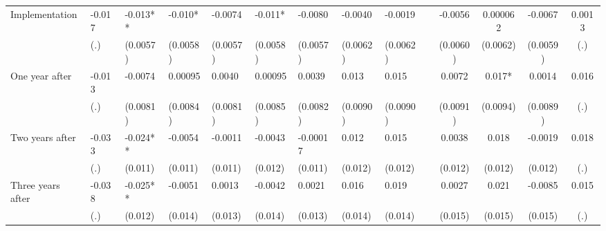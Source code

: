 \begin{tabular}{lccccrrrrrcccc}
Implementation & \multicolumn{1}{l}{-0.017} & \multicolumn{1}{l}{-0.013**} & \multicolumn{1}{l}{-0.010*} & \multicolumn{1}{l}{-0.0074} & \multicolumn{1}{l}{-0.011*} & \multicolumn{1}{l}{-0.0080} & \multicolumn{1}{l}{-0.0040} & \multicolumn{1}{l}{-0.0019} &       & -0.0056 & 0.000062 & -0.0067 & 0.0013 \\
      & \multicolumn{1}{l}{(.)} & \multicolumn{1}{l}{(0.0057)} & \multicolumn{1}{l}{(0.0058)} & \multicolumn{1}{l}{(0.0057)} & \multicolumn{1}{l}{(0.0058)} & \multicolumn{1}{l}{(0.0057)} & \multicolumn{1}{l}{(0.0062)} & \multicolumn{1}{l}{(0.0062)} &       & (0.0060) & (0.0062) & (0.0059) & (.) \\
One year after & \multicolumn{1}{l}{-0.013} & \multicolumn{1}{l}{-0.0074} & \multicolumn{1}{l}{0.00095} & \multicolumn{1}{l}{0.0040} & \multicolumn{1}{l}{0.00095} & \multicolumn{1}{l}{0.0039} & \multicolumn{1}{l}{0.013} & \multicolumn{1}{l}{0.015} &       & 0.0072 & 0.017* & 0.0014 & 0.016 \\
      & \multicolumn{1}{l}{(.)} & \multicolumn{1}{l}{(0.0081)} & \multicolumn{1}{l}{(0.0084)} & \multicolumn{1}{l}{(0.0081)} & \multicolumn{1}{l}{(0.0085)} & \multicolumn{1}{l}{(0.0082)} & \multicolumn{1}{l}{(0.0090)} & \multicolumn{1}{l}{(0.0090)} &       & (0.0091) & (0.0094) & (0.0089) & (.) \\
Two years after & \multicolumn{1}{l}{-0.033} & \multicolumn{1}{l}{-0.024**} & \multicolumn{1}{l}{-0.0054} & \multicolumn{1}{l}{-0.0011} & \multicolumn{1}{l}{-0.0043} & \multicolumn{1}{l}{-0.00017} & \multicolumn{1}{l}{0.012} & \multicolumn{1}{l}{0.015} &       & 0.0038 & 0.018 & -0.0019 & 0.018 \\
      & \multicolumn{1}{l}{(.)} & \multicolumn{1}{l}{(0.011)} & \multicolumn{1}{l}{(0.011)} & \multicolumn{1}{l}{(0.011)} & \multicolumn{1}{l}{(0.012)} & \multicolumn{1}{l}{(0.011)} & \multicolumn{1}{l}{(0.012)} & \multicolumn{1}{l}{(0.012)} &       & (0.012) & (0.012) & (0.012) & (.) \\
Three years after & \multicolumn{1}{l}{-0.038} & \multicolumn{1}{l}{-0.025**} & \multicolumn{1}{l}{-0.0051} & \multicolumn{1}{l}{0.0013} & \multicolumn{1}{l}{-0.0042} & \multicolumn{1}{l}{0.0021} & \multicolumn{1}{l}{0.016} & \multicolumn{1}{l}{0.019} &       & 0.0027 & 0.021 & -0.0085 & 0.015 \\
      & \multicolumn{1}{l}{(.)} & \multicolumn{1}{l}{(0.012)} & \multicolumn{1}{l}{(0.014)} & \multicolumn{1}{l}{(0.013)} & \multicolumn{1}{l}{(0.014)} & \multicolumn{1}{l}{(0.013)} & \multicolumn{1}{l}{(0.014)} & \multicolumn{1}{l}{(0.014)} &       & (0.015) & (0.015) & (0.015) & (.) \\

\end{tabular}
